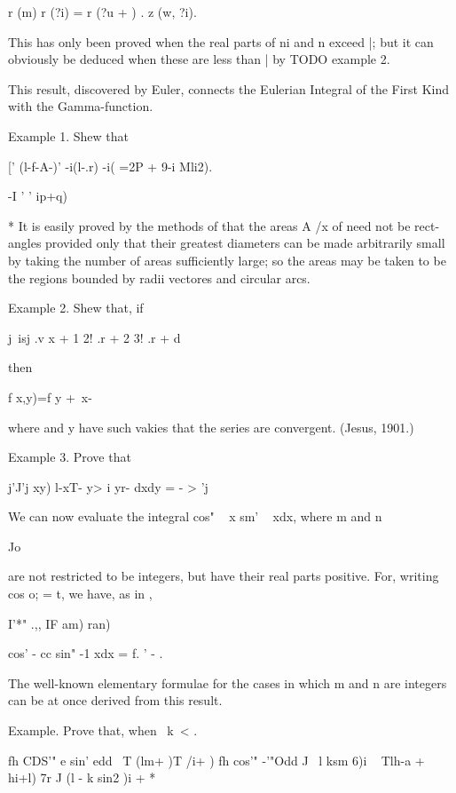 r (m) r (?i) = r (?u + ) . z (w, ?i).

This has only been proved when the real parts of ni and n exceed |;
but it can obviously be deduced when these are less than | by TODO
example 2.

This result, discovered by Euler, connects the Eulerian Integral of
the First Kind with the Gamma-function.

Example 1. Shew that

[' (l-f-A-)' -i(l-.r) -i( =2P + 9-i Mli2).

  -I ' ' ip+q)

  * It is easily proved by the methods of  that the areas A /x of
   need not be rect- angles provided only that their greatest
diameters can be made arbitrarily small by taking the number of areas
sufficiently large; so the areas may be taken to be the regions
bounded by radii vectores and circular arcs.

%
%

Example 2. Shew that, if

j\ isj .v x + 1 2! .r + 2 3! .r + d

then

f x,y)=f y + \,x-\ \

where and y have such vakies that the series are convergent. (Jesus,
1901.)

Example 3. Prove that

j'J'j xy) l-xT- y> i yr- dxdy = - > 'j



We can now evaluate the integral cos" ~ x sm' ~ xdx, where m and n

Jo

are not restricted to be integers, but have their real parts positive.
For, writing cos o; = t, we have, as in ,

I'*" .,, IF am) ran)

cos' - cc sin" -1 xdx = f. ' - .

The well-known elementary formulae for the cases in which m and n are
integers can be at once derived from this result.

Example. Prove that, when \ k\ < .\,

fh CDS'" e sin' edd \ T (lm+ )T /i+ ) fh cos'" -'"Odd J \ l ksm 6)i ~
Tlh-a + hi+l) 7r J (l - k sin2 )i + *

